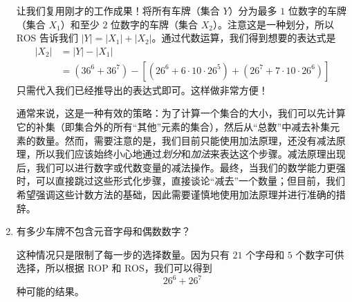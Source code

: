 \begin{example}[车牌]
\begin{enumerate}[label=(\arabic*)]
              让我们复用刚才的工作成果！将所有车牌（集合 $Y$）分为最多 $1$ 位数字的车牌（集合 $X_1$）和至少 $2$ 位数字的车牌（集合 $X_2$）。注意这是一种划分，所以 ROS 告诉我们 $|Y| = |X_1| + |X_2|$。通过代数运算，我们得到想要的表达式是
              \begin{align*}
                  |X_2| & = |Y| - |X_1|                                                                       \\
                        & = (36^6 + 36^7) - [(26^6 + 6 \cdot 10 \cdot 26^5) + (26^7 + 7 \cdot 10 \cdot 26^6)]
              \end{align*}
              只需代入我们已经推导出的表达式即可。这样做非常方便！

              通常来说，这是一种有效的策略：为了计算一个集合的大小，我们可以先计算它的补集（即集合外的所有``其他''元素的集合），然后从``总数''中减去补集元素的数量。然而，需要注意的是，我们目前只能使用加法原理，还没有减法原理，所以我们应该始终小心地通过\emph{划分}和\emph{加法}来表达这个步骤。减法原理出现后，我们可以进行数字或代数变量的减法操作。最终，当我们的数学能力更强时，可以直接跳过这些形式化步骤，直接谈论``减去''一个数量；但目前，我们希望强调这些计数方法的基础，因此需要谨慎地使用加法原理并进行准确的措辞。\\
        \item 有多少车牌不包含元音字母和偶数数字？

              这种情况只是限制了每一步的选择数量。因为只有 $21$ 个字母和 $5$ 个数字可供选择，所以根据 ROP 和 ROS，我们可以得到
              \[26^6 + 26^7\]
              种可能的结果。
    \end{enumerate}
\end{example}